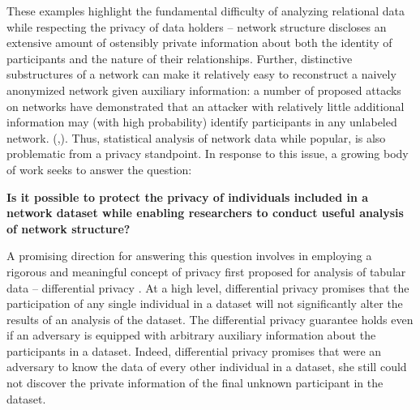 
These examples highlight the fundamental difficulty of analyzing relational data while respecting the privacy of data holders -- network structure discloses an extensive amount of ostensibly private information about both the identity of participants and the nature of their relationships. Further, distinctive substructures of a network can make it relatively easy to reconstruct a naively anonymized network given auxiliary information: a number of proposed attacks on networks have demonstrated that an attacker with relatively little additional information may (with high probability) identify participants in any unlabeled network. (\cite{BDK11},\cite{NS09}). Thus, statistical analysis of network data while popular, is also problematic from a privacy standpoint. In response to this issue, a growing body of work seeks to answer the question:

\textbf{Is it possible to protect the privacy of individuals included in a network dataset while enabling researchers to conduct useful analysis of network structure?}

A promising direction for answering this question involves in employing a rigorous and meaningful concept of privacy first proposed for analysis of tabular data -- differential privacy \cite{DMNS06}. At a high level, differential privacy promises that the participation of any single individual in a dataset will not significantly alter the results of an analysis of the dataset. The differential privacy guarantee  holds even if an adversary is equipped with arbitrary auxiliary information about the participants in a dataset. Indeed, differential privacy promises that were an adversary to know the data of every other individual in a dataset, she still could not discover the private information of the final unknown participant in the dataset. 


